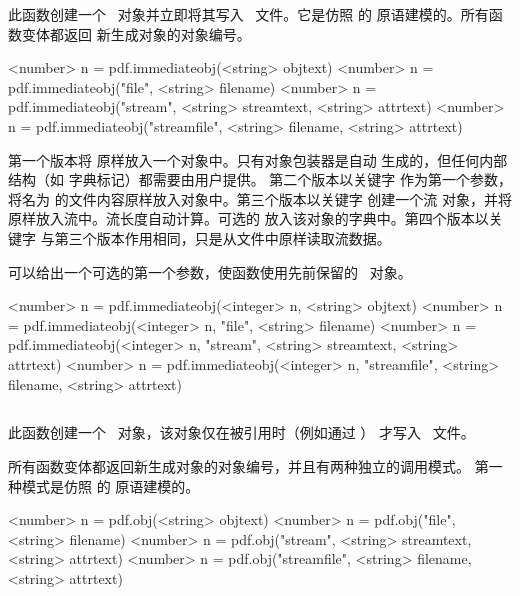 

此函数创建一个 \PDF\ 对象并立即将其写入 \PDF\ 文件。它是仿照
\PDFTEX 的   原语建模的。所有函数变体都返回
新生成对象的对象编号。

\begin{typing}
<number> n =
    pdf.immediateobj(<string> objtext)
<number> n =
    pdf.immediateobj("file", <string> filename)
<number> n =
    pdf.immediateobj("stream", <string> streamtext, <string> attrtext)
<number> n =
    pdf.immediateobj("streamfile", <string> filename, <string> attrtext)
\end{typing}

第一个版本将  原样放入一个对象中。只有对象包装器是自动
生成的，但任何内部结构（如 \type{<< >>} 字典标记）都需要由用户提供。
第二个版本以关键字  作为第一个参数，将名为 
的文件内容原样放入对象中。第三个版本以关键字  创建一个流
对象，并将  原样放入流中。流长度自动计算。可选的
 放入该对象的字典中。第四个版本以关键字 
与第三个版本作用相同，只是从文件中原样读取流数据。

可以给出一个可选的第一个参数，使函数使用先前保留的 \PDF\ 对象。

\begin{typing}
<number> n =
    pdf.immediateobj(<integer> n, <string> objtext)
<number> n =
    pdf.immediateobj(<integer> n, "file", <string> filename)
<number> n =
    pdf.immediateobj(<integer> n, "stream", <string> streamtext, <string> attrtext)
<number> n =
    pdf.immediateobj(<integer> n, "streamfile", <string> filename, <string> attrtext)
\end{typing}

\subsection{}



此函数创建一个 \PDF\ 对象，该对象仅在被引用时（例如通过 ）
才写入 \PDF\ 文件。

所有函数变体都返回新生成对象的对象编号，并且有两种独立的调用模式。
第一种模式是仿照 \PDFTEX 的  原语建模的。

\begin{typing}
<number> n =
    pdf.obj(<string> objtext)
<number> n =
    pdf.obj("file", <string> filename)
<number> n =
    pdf.obj("stream", <string> streamtext, <string> attrtext)
<number> n =
    pdf.obj("streamfile", <string> filename, <string> attrtext)
\end{typing}

